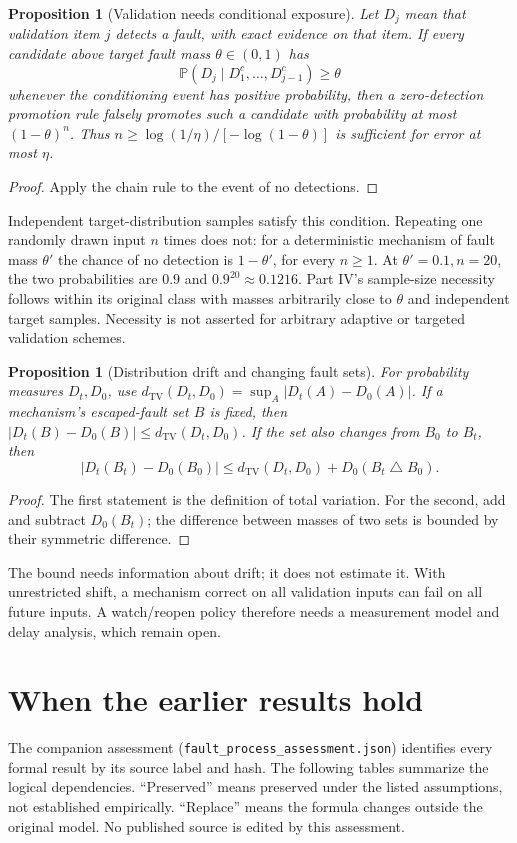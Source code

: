 \documentclass[11pt]{article}
\newtheorem{proposition}[theorem]{Proposition}
\theoremstyle{definition}
\theoremstyle{remark}
\newcommand{\Prb}{\mathbb P}
\newcommand{\TV}{d_{\mathrm{TV}}}
\begin{document}
\begin{proposition}[Validation needs conditional exposure]\label{prop:validation}
Let $D_j$ mean that validation item $j$ detects a fault, with exact evidence on that item.
If every candidate above target fault mass $\theta\in(0,1)$ has
\[
\Prb(D_j\mid D_1^c,\ldots,D_{j-1}^c)\ge\theta
\]
whenever the conditioning event has positive probability, then a zero-detection promotion
rule falsely promotes such a candidate with probability at most $(1-\theta)^n$.
Thus $n\ge\log(1/\eta)/[-\log(1-\theta)]$ is sufficient for error at most $\eta$.
\end{proposition}
\begin{proof}
Apply the chain rule to the event of no detections.
\end{proof}
Independent target-distribution samples satisfy this condition. Repeating one randomly drawn
input $n$ times does not: for a deterministic mechanism of fault mass $\theta'$ the chance
of no detection is $1-\theta'$, for every $n\ge1$.
At $\theta'=0.1,n=20$, the two probabilities are $0.9$ and $0.9^{20}\approx0.1216$.
Part IV's sample-size necessity follows within its original class with masses arbitrarily
close to $\theta$ and independent target samples. Necessity is not asserted for arbitrary
adaptive or targeted validation schemes.

\begin{proposition}[Distribution drift and changing fault sets]\label{prop:drift}
For probability measures $D_t,D_0$, use
$\TV(D_t,D_0)=\sup_A|D_t(A)-D_0(A)|$.
If a mechanism's escaped-fault set $B$ is fixed, then
$|D_t(B)-D_0(B)|\le\TV(D_t,D_0)$.
If the set also changes from $B_0$ to $B_t$, then
\[
|D_t(B_t)-D_0(B_0)|\le\TV(D_t,D_0)+D_0(B_t\mathbin\triangle B_0).
\]
\end{proposition}
\begin{proof}
The first statement is the definition of total variation. For the second, add and subtract
$D_0(B_t)$; the difference between masses of two sets is bounded by their symmetric difference.
\end{proof}
The bound needs information about drift; it does not estimate it. With unrestricted shift,
a mechanism correct on all validation inputs can fail on all future inputs.
A watch/reopen policy therefore needs a measurement model and delay analysis, which remain open.

\section{When the earlier results hold}\label{sec:audit}
The companion assessment (\texttt{fault\_process\_assessment.json}) identifies every formal result by its source label and hash.
The following tables summarize the logical dependencies. ``Preserved'' means preserved under
the listed assumptions, not established empirically. ``Replace'' means the formula changes
outside the original model. No published source is edited by this assessment.
\end{document}
